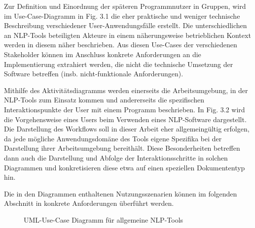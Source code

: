 \documentclass[12pt]{report}
\begin{document}
Zur Definition und Einordnung der späteren Programmnutzer in Gruppen, wird im  Use-Case-Diagramm in Fig. 3.1 die eher praktische und weniger technische Beschreibung verschiedener User-Anwendungsfälle erstellt. Die unterschiedlichen an NLP-Tools beteiligten Akteure in einem näherungsweise betrieblichen Kontext werden in diesem näher beschrieben. Aus diesen Use-Cases der verschiedenen Stakeholder können im Anschluss konkrete Anforderungen an die Implementierung extrahiert werden, die nicht die technische Umsetzung der Software betreffen (insb. nicht-funktionale Anforderungen).

Mithilfe des Aktivitätsdiagramms werden einerseits die Arbeitsumgebung, in der NLP-Tools zum Einsatz kommen und andererseits die spezifischen Interaktionspunkte der User mit einem Programm beschrieben. In Fig. 3.2 wird die Vorgehensweise eines Users beim Verwenden eines NLP-Software dargestellt. Die Darstellung des Workflows soll in dieser Arbeit eher allgemeingültig erfolgen, da jede mögliche Anwendungsdomäne des Tools eigene Spezifika bei der Darstellung ihrer Arbeitsumgebung bereithält. Diese Besonderheiten betreffen dann auch die Darstellung und Abfolge der Interaktionsschritte in solchen Diagrammen und konkretisieren diese etwa auf einen speziellen Dokumententyp hin.

Die in den Diagrammen enthaltenen Nutzungsszenarien können im folgenden Abschnitt in konkrete Anforderungen überführt werden.

\begin{figure}
\begin{center}
\caption{UML-Use-Case Diagramm für allgemeine NLP-Tools}
\end{center}
\end{figure}
\end{document}
